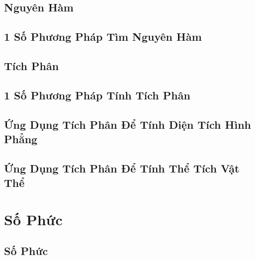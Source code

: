 \documentclass[oneside]{book}
\numberwithin{equation}{section}
\begin{document}
\section{Nguyên Hàm}


\section{1 Số Phương Pháp Tìm Nguyên Hàm}


\section{Tích Phân}


\section{1 Số Phương Pháp Tính Tích Phân}


\section{Ứng Dụng Tích Phân Để Tính Diện Tích Hình Phẳng}


\section{Ứng Dụng Tích Phân Để Tính Thể Tích Vật Thể}


\chapter{Số Phức}

\section{Số Phức}
\end{document}
